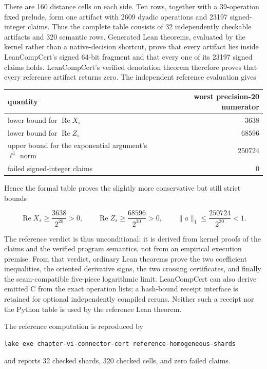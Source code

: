 \documentclass[11pt]{article}
\newcommand{\re}{\operatorname{Re}}
\begin{document}
There are 160 distance cells on each side.  Ten rows, together with a 39-operation fixed prelude,
form one artifact with 2609 dyadic operations and 23197 signed-integer claims.  Thus the complete
table consists of 32 independently checkable artifacts and 320 semantic rows.  Generated Lean
theorems, evaluated by the kernel rather than a native-decision shortcut, prove that every
artifact lies inside LeanCompCert's signed 64-bit fragment and that every one of its 23197
signed claims holds.  LeanCompCert's verified denotation theorem therefore proves that every
reference artifact returns zero.  The independent reference evaluation gives

\begin{center}
\begin{tabular}{lr}
\toprule
quantity & worst precision-20 numerator\\
\midrule
lower bound for $\re X_s$ & $3638$\\
lower bound for $\re Z_s$ & $68596$\\
upper bound for the exponential argument's $\ell^1$ norm & $250724$\\
failed signed-integer claims & $0$\\
\bottomrule
\end{tabular}
\end{center}
Hence the formal table proves the slightly more conservative but still strict bounds

\[
  \re X_s\geq\frac{3638}{2^{20}}>0,
  \qquad
  \re Z_s\geq\frac{68596}{2^{20}}>0,
  \qquad
  \lVert a\rVert_1\leq\frac{250724}{2^{20}}<1.
\]

The reference verdict is thus unconditional: it is derived from kernel proofs of the claims and
the verified program semantics, not from an empirical execution premise.  From that verdict,
ordinary Lean theorems prove the two coefficient inequalities, the oriented derivative signs,
the two crossing certificates, and finally the seam-compatible five-piece logarithmic limit.
LeanCompCert can also derive emitted C from the exact operation lists; a hash-bound receipt
interface is retained for optional independently compiled reruns.  Neither such a receipt nor the
Python table is used by the reference Lean theorem.

The reference computation is reproduced by
\begin{verbatim}
lake exe chapter-vi-connector-cert reference-homogeneous-shards
\end{verbatim}
and reports 32 checked shards, 320 checked cells, and zero failed claims.
\end{document}
